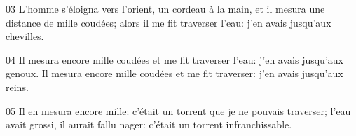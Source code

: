 
03 L’homme s’éloigna vers l’orient, un cordeau à la main, et il mesura une distance de mille coudées; alors il me fit traverser l’eau: j’en avais jusqu’aux chevilles.

04 Il mesura encore mille coudées et me fit traverser l’eau: j’en avais jusqu’aux genoux. Il mesura encore mille coudées et me fit traverser: j’en avais jusqu’aux reins.

05 Il en mesura encore mille: c’était un torrent que je ne pouvais traverser; l’eau avait grossi, il aurait fallu nager: c’était un torrent infranchissable.
